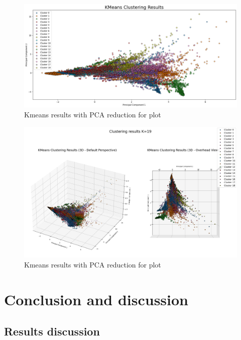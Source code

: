 \documentclass[12pt,a4paper,twoside]{article}
\begin{document}
\begin{figure}[!ht]
    \centering
    \includegraphics[width=\textwidth,height=\textheight,keepaspectratio]{assets/kmeans-num.png}
    \caption{Kmeans results with PCA reduction for plot}
    \label{fig:}
\end{figure}

\begin{figure}[!ht]
    \centering
    \includegraphics[width=\textwidth,height=\textheight,keepaspectratio]{assets/kmeans-num-fancy.png}
    \caption{Kmeans results with PCA reduction for plot}
    \label{fig:}
\end{figure}

\newpage
\clearpage

\section{Conclusion and discussion}

\subsection{Results discussion}
\end{document}
